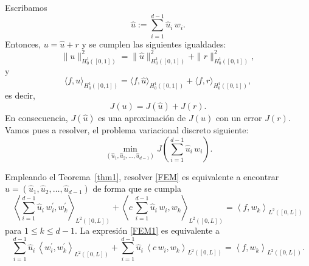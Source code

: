 \documentclass[10pt,handout]{beamer}
\theoremstyle{plain} %
\theoremstyle{plain} %
\theoremstyle{plain} %
\theoremstyle{plain} %
\theoremstyle{definition}
\theoremstyle{example}
\theoremstyle{example}
\theoremstyle{remark}
\theoremstyle{remark}
\begin{document}
\begin{frame}
Escribamos
$$
\widehat{u} := \sum_{i=1}^{d-1} \widehat{u}_i \, w_i.
$$
Entonces, $u = \widehat{u} + r$ y se cumplen las siguientes igualdades:
\begin{equation}
\|u\|_{H^1_0([0,1])}^2 = \|\widehat{u}\|_{H^1_0([0,1])}^2+ \|r\|_{H^1_0([0,1])}^2, \label{orto1}
\end{equation}
y
\begin{equation}
\langle f,u \rangle_{H_0^1([0,1])} = \langle f,\widehat{u} \rangle_{H_0^1([0,1])} + \langle f,r \rangle_{H_0^1([0,1])}, \label{orto2}
\end{equation}
es decir,
$$
J(u) = J(\widehat{u}) + J(r).
$$
En consecuencia, $J(\widehat{u})$ es una aproximación de $J(u)$ con un error $J(r).$ Vamos pues a resolver,
el problema variacional discreto siguiente:
\begin{equation}
\min_{( \widehat{u}_1, \widehat{u}_2,\ldots, \widehat{u}_{d-1})}J\left( \sum_{i=1}^{d-1} \widehat{u}_i \, w_i\right). \label{FEM}
\end{equation}
\end{frame}

\begin{frame}
Empleando el Teorema~\ref{thm1}, resolver \eqref{FEM} es equivalente a encontrar 
$\widehat{u}=( \widehat{u}_1, \widehat{u}_2,\ldots, \widehat{u}_{d-1})$ de forma que se cumpla
\begin{equation}
\left\langle  \sum_{i=1}^{d-1} \widehat{u}_i \, w_i^{\prime} , w_k^{\prime} \right\rangle_{L^2([0,L])}  + \left\langle  c\,\sum_{i=1}^{d-1} \widehat{u}_i \, w_i, w_{k} \right\rangle_{L^2([0,L])} =  \left\langle f, w_{k} \right\rangle_{L^2([0,L])} \label{FEM1}
\end{equation}
para $1 \le k \le d-1.$ La expresión \eqref{FEM1} es equivalente a
\begin{equation}
\sum_{i=1}^{d-1} \widehat{u}_i \,\left\langle  w_i^{\prime} , w_k^{\prime} \right\rangle_{L^2([0,L])}  + \sum_{i=1}^{d-1} \widehat{u}_i \, \left\langle  c\,w_i, w_{k} \right\rangle_{L^2([0,L])} =  \left\langle f, w_{k} \right\rangle_{L^2([0,L])} \label{FEM2}.
\end{equation}
\end{frame}
\end{document}
